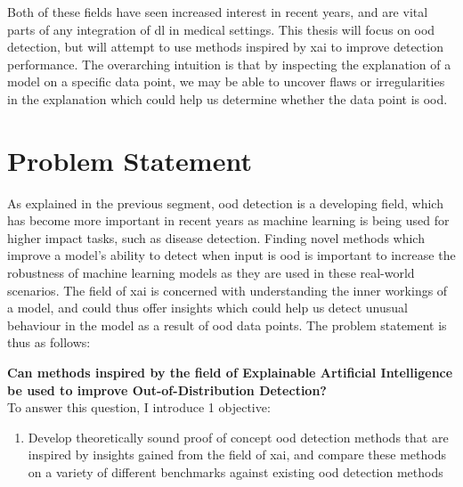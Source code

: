 \documentclass[UKenglish]{uiomasterthesis} %
\theoremstyle{definition}
\begin{document}
Both of these fields have seen increased interest in recent years, and are vital parts of any integration of \ac{dl} in medical settings. This thesis will focus on \ac{ood} detection, but will attempt to use methods inspired by \ac{xai} to improve detection performance. The overarching intuition is that by inspecting the explanation of a model on a specific data point, we may be able to uncover flaws or irregularities in the explanation which could help us determine whether the data point is \ac{ood}.


\section{Problem Statement} \label{section:problemstatement}

As explained in the previous segment, \ac{ood} detection is a developing field, which has become more important in recent years as machine learning is being used for higher impact tasks, such as disease detection. Finding novel methods which improve a model's ability to detect when input is \ac{ood} is important to increase the robustness of machine learning models as they are used in these real-world scenarios. The field of \ac{xai} is concerned with understanding the inner workings of a model, and could thus offer insights which could help us detect unusual behaviour in the model as a result of \ac{ood} data points. The problem statement is thus as follows:

\textbf{Can methods inspired by the field of Explainable Artificial Intelligence be used to improve Out-of-Distribution Detection?}
\\

To answer this question, I introduce 1 objective:

\begin{enumerate}
  \item Develop theoretically sound proof of concept \ac{ood} detection methods that are inspired by insights gained from the field of \ac{xai}, and compare these methods on a variety of different benchmarks against existing \ac{ood} detection methods
\end{enumerate}
\end{document}
